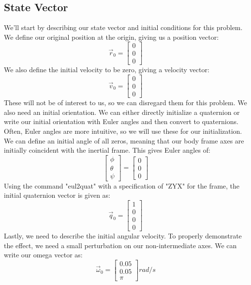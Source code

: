 \documentclass[10pt, openany, titlepage]{book}
\theoremstyle{definition}
\begin{document}
\subsection{State Vector}
We'll start by describing our \gls{state vector} and initial conditions for this problem. We define our original position at the origin, giving us a position vector:
$$\vec{r}_0=\begin{bmatrix}
    0\\0\\0
\end{bmatrix}$$
We also define the initial velocity to be zero, giving a velocity vector:
$$\vec{v}_0=\begin{bmatrix}
    0\\0\\0
\end{bmatrix}$$
These will not be of interest to us, so we can disregard them for this problem. We also need an initial orientation. We can either directly initialize a \gls{quaternion} or write our initial orientation with \gls{Euler angles} and then convert to \glspl{quaternion}. Often, \gls{Euler angles} are more intuitive, so we will use these for our initialization. We can define an initial angle of all zeros, meaning that our \gls{body frame} axes are initially coincident with the \gls{inertial frame}. This gives \gls{Euler angles} of:
$$\begin{bmatrix}
    \phi\\\theta\\\psi
\end{bmatrix} =
\begin{bmatrix}
    0\\0\\0
\end{bmatrix}$$
Using the command "eul2quat" with a specification of "ZYX" for the frame, the initial \gls{quaternion} vector is given as:
$$\vec{q}_0=\begin{bmatrix}
    1\\0\\0\\0
\end{bmatrix}$$
Lastly, we need to describe the initial angular velocity. To properly demonstrate the effect, we need a small perturbation on our non-intermediate axes. We can write our omega vector as:
$$\vec{\omega}_0=\begin{bmatrix}
0.05\\0.05\\\pi
\end{bmatrix} rad/s$$
\end{document}
